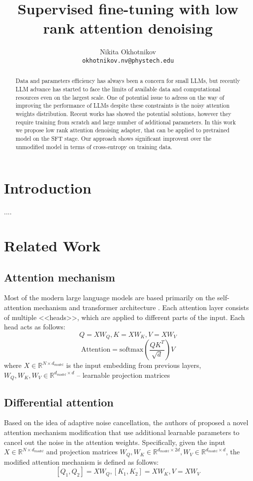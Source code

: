 \documentclass{article}
\title{Supervised fine-tuning with low rank attention denoising}
\author{Nikita Okhotnikov\\
	\texttt{okhotnikov.nv@phystech.edu} \\
}
\date{}
\begin{document}
\maketitle
\begin{abstract}
    Data and parameters efficiency has always been a concern for small LLMs, but recently LLM advance has started to face the limits of available data and computational resources even on the largest scale. One of potential issue to adress on the way of improving the performance of LLMs despite these constraints is the noisy attention weights distribution. Recent works has showed the potential solutions, however they require training from scratch and large number of additional parameters. In this work we propose low rank attention denoising adapter, that can be applied to pretrained model on the SFT stage. Our approach shows significant improvent over the unmodified model in terms of cross-entropy on training data.
\end{abstract}

\section{Introduction}
    ....

\section{Related Work}
\subsection{Attention mechanism}
    Most of the modern large language models are based primarily on the self-attention mechanism and transformer architecture \cite{vaswani2023attentionneed}. Each attention layer consists of multiple <<heads>>, which are applied to different parts of the input. Each head acts as follows:
    $$Q = X W_Q, K = X W_K, V = X W_V$$
    $$\text{Attention} = \text{softmax}\left(\frac{Q K^T}{\sqrt{d}}\right) V$$
    where $X \in \mathbb{R}^{N \times d_{model}}$ is the input embedding from previous layers, $W_Q, W_K, W_V \in \mathbb{R}^{d_{model} \times d}$ -- learnable projection matrices

\subsection{Differential attention}
    Based on the idea of adaptive noise cancellation, the authors of \cite{ye2025differentialtransformer} proposed a novel attention mechanism modification that use additional learnable parameters to cancel out the noise in the attention weights.
    Specifically, given the input $X\in \mathbb{R}^{N\times d_{model}}$ and projection matrices $W_Q, W_K \in \mathbb{R}^{d_{model} \times 2d}, W_V \in \mathbb{R}^{d_{model} \times d}$, the modified attention mechanism is defined as follows:
    $$[Q_1, Q_2] = XW_Q, [K_1, K_2] = XW_K, V = XW_V$$
\end{document}
